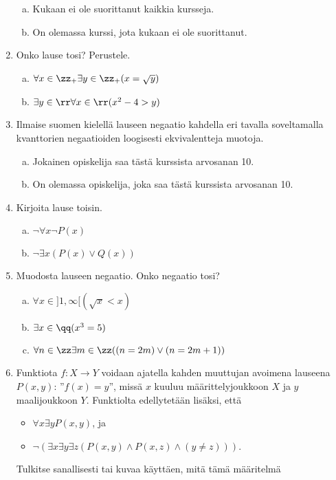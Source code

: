 \begin{kotitehtavasivu}
\begin{enumerate}
\begin{enumerate}[a)]
\item Kukaan ei ole suorittanut kaikkia kursseja.
\item On olemassa kurssi, jota kukaan ei ole suorittanut.
\end{enumerate}%
\item Onko lause tosi? Perustele.
\begin{enumerate}[a)]
\item $\forall x\in \zz_{+} \exists y\in \zz_{+} (x = \sqrt{y})
$
\item $\exists y\in \rr \forall x\in \rr (x^2 - 4 > y)$
\end{enumerate}%
\item Ilmaise suomen kielellä lauseen negaatio kahdella eri
tavalla soveltamalla kvanttorien negaatioiden loogisesti
ekvivalentteja muotoja.
\begin{enumerate}[a)]
\item Jokainen opiskelija saa tästä kurssista arvosanan 10.
\item On olemassa opiskelija, joka saa tästä kurssista
arvosanan 10.
\end{enumerate}%
\item Kirjoita lause toisin.
\begin{enumerate}[a)]
\item $\lnot \forall x \lnot P(x)$
\item $\lnot \exists x (P(x) \lor Q(x))$
\end{enumerate}%
\item
Muodosta lauseen negaatio. Onko negaatio tosi?
\begin{enumerate}[a)]
\item $\forall x\in ]1, \infty [ (\sqrt{x} < x)$
\item $\exists x\in \qq (x^3 = 5)$
\item $\forall n \in \zz \exists m \in \zz ((n = 2m) \lor (n =
2m+1))$
\end{enumerate}%
\item Funktiota $f\colon X\to Y$ voidaan ajatella kahden
muuttujan avoimena lauseena $P(x, y)$: ''$f(x) = y$'', missä
$x$ kuuluu määrittelyjoukkoon $X$ ja $y$ maalijoukkoon $Y$.
Funktiolta edellytetään lisäksi, että
\begin{itemize}
\item $\forall x \exists y P(x, y)$, ja
\item $\lnot (\exists x \exists y \exists z (P(x, y) \land P(x, z)
\land (y \neq z)))$.
\end{itemize}
Tulkitse sanallisesti tai kuvaa käyttäen, mitä tämä määritelmä

\end{enumerate}
\end{kotitehtavasivu}
